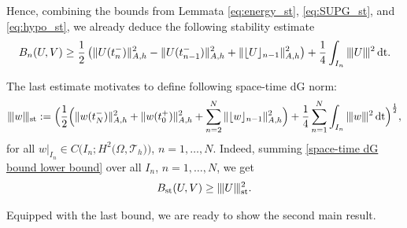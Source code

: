 \documentclass{amsart}
\newcommand{\norm}[2]{\|{#1}\|_{{#2}}}
\newcommand{\Th}{\mathcal{T}_h}
\newcommand{\ndg}[1]{|\kern-.03cm \|{#1}|\kern-.03cm \|}
\newcommand{\jumpu}[1]{ \lfloor #1 \rfloor }
\newcommand{\dt}{\,{\rm dt}}
\theoremstyle{definition}
\theoremstyle{remark}
\numberwithin{equation}{section}
\begin{document}
Hence, combining the bounds from Lemmata \ref{eq:energy_st}, \ref{eq:SUPG_st}, and \ref{eq:hypo_st}, we already deduce the following stability estimate
    \begin{equation}\label{space-time dG bound lower bound}
        B_n(U,V)
        \geq
 \frac{1}{2}\left(
	\norm{U(t_n^-)}{A,h}^2  -	\norm{U(t_{n-1}^-)}{A,h}^2 + \norm{\jumpu{U}_{n-1}}{A,h}^2  \right)
+ \frac{1}{4}\int_{I_n} \ndg{U}^2 \dt.
    \end{equation}


The last estimate motivates to define following space-time dG norm:
\begin{equation}\label{def: space-time dG norm}
    \ndg{w}_{\rm st}
  :  =\Big(
    \frac{1}{2}\Big(
	\norm{w(t_N^-)}{A,h}^2  +	\norm{w(t_0^+)}{A,h}^2 + \sum_{n=2}^N \norm{\jumpu{w}_{n-1}}{A,h}^2  \Big)
+ \frac{1}{4} \sum_{n=1}^N \int_{I_n} \ndg{w}^2 \dt\Big)^{\frac{1}{2}},
\end{equation}
for all $w|_{I_n}\in C(I_n;H^2(\Omega,\Th {))}$, $n=1,\dots,N$. Indeed, summing \eqref{space-time dG bound lower bound} over all $I_n$, $n=1,\dots, N$,  we get
    \begin{equation}\label{coerFD}
        B_{\rm st}(U,V)
        \geq
 \ndg{U}_{\rm st}^2.
    \end{equation}

Equipped with the last bound, we are ready to show the second main result.
\end{document}
